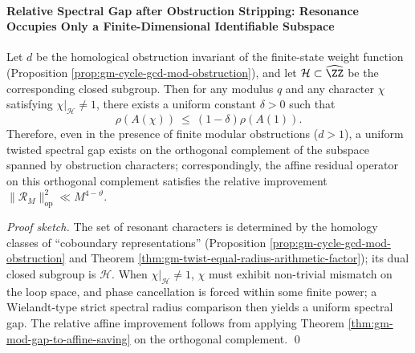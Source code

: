 \paragraph{Relative Spectral Gap after Obstruction Stripping: Resonance Occupies Only a Finite-Dimensional Identifiable Subspace}
\begin{theorem}\label{thm:gm-relative-gap-after-obstruction}
Let \(d\) be the homological obstruction invariant of the finite-state weight function (Proposition \ref{prop:gm-cycle-gcd-mod-obstruction}), and let \(\mathcal{H}\subset\widehat{\ZZ}\) be the corresponding closed subgroup.
Then for any modulus \(q\) and any character \(\chi\) satisfying \(\chi|_{\mathcal{H}}\neq 1\), there exists a uniform constant \(\delta>0\) such that
\[
\rho(A(\chi))\ \le\ (1-\delta)\rho(A(1)).
\]
Therefore, even in the presence of finite modular obstructions (\(d>1\)), a uniform twisted spectral gap exists on the orthogonal complement of the subspace spanned by obstruction characters; correspondingly, the affine residual operator on this orthogonal complement satisfies the relative improvement \(\|\mathcal{R}_M\|_{\mathrm{op}}^2\ll M^{4-\vartheta}\).
\end{theorem}

\begin{proof}[Proof sketch]
The set of resonant characters is determined by the homology classes of ``coboundary representations'' (Proposition \ref{prop:gm-cycle-gcd-mod-obstruction} and Theorem \ref{thm:gm-twist-equal-radius-arithmetic-factor}); its dual closed subgroup is \(\mathcal{H}\).
When \(\chi|_{\mathcal{H}}\neq 1\), \(\chi\) must exhibit non-trivial mismatch on the loop space, and phase cancellation is forced within some finite power; a Wielandt-type strict spectral radius comparison then yields a uniform spectral gap.
The relative affine improvement follows from applying Theorem \ref{thm:gm-mod-gap-to-affine-saving} on the orthogonal complement. \qed
\end{proof}

